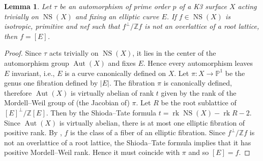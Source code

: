 \documentclass[a4paper]{amsart}
\theoremstyle{definition}
\theoremstyle{plain}
\newtheorem{lemma}[definition]{Lemma}
\DeclareMathOperator{\rk}{rk}
\DeclareMathOperator{\NS}{NS}
\DeclareMathOperator{\Aut}{Aut}
\newcommand{\ZZ}{\mathbb{Z}}
\newcommand{\PP}{\mathbb{P}}
\begin{document}
\begin{lemma}\label{identifyE}
 Let $\tau$ be an automorphism of prime order $p$ of a K3 surface $X$ acting trivially on $\NS(X)$ and fixing an elliptic curve $E$. If $f \in \NS(X)$ is isotropic, primitive and nef such that $f^\perp /\ZZ f$ is not an overlattice of a root lattice, then $f = [E]$.
\end{lemma}
\begin{proof}
 Since $\tau$ acts trivially on $\NS(X)$, it lies in the center of the automorphism group $\Aut(X)$ and fixes $E$. Hence every automorphism leaves $E$ invariant, i.e., $E$ is a curve canonically defined on $X$.
 Let $\pi\colon X \to \PP^1$ be the genus one fibration defined by $|E|$.
The fibration $\pi$ is canonically defined, therefore $\Aut(X)$ is virtually abelian of rank $t$ given by the rank of the Mordell--Weil group of (the Jacobian of) $\pi$.
Let $R$ be the root sublattice of $[E]^\perp/\ZZ[E]$. Then by the Shioda--Tate formula \cite[5.2]{shioda1990} $t=\rk \NS(X)-\rk R -2$. Since $\Aut(X)$ is virtually abelian, there is at most one elliptic fibration of positive rank. By \cite[\S 3]{shafarevich1972}, $f$ is the class of a fiber of an elliptic fibration. Since $f^\perp/\ZZ f$ is not an overlattice of a root lattice, the Shioda--Tate formula implies that it has positive Mordell--Weil rank. Hence it must coincide with $\pi$ and so $[E] = f$.
\end{proof}
\end{document}
